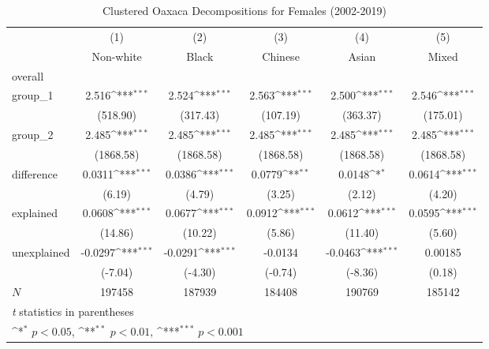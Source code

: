 \begin{table}[htbp]\centering
\def\sym#1{\ifmmode^{#1}\else\(^{#1}\)\fi}
\caption{Clustered Oaxaca Decompositions for Females (2002-2019)\label{tab1}}
\begin{tabular}{l*{5}{c}}
\hline\hline
            &\multicolumn{1}{c}{(1)}&\multicolumn{1}{c}{(2)}&\multicolumn{1}{c}{(3)}&\multicolumn{1}{c}{(4)}&\multicolumn{1}{c}{(5)}\\
            &\multicolumn{1}{c}{Non-white}&\multicolumn{1}{c}{Black}&\multicolumn{1}{c}{Chinese}&\multicolumn{1}{c}{Asian}&\multicolumn{1}{c}{Mixed}\\
\hline
overall     &                     &                     &                     &                     &                     \\
group\_1     &       2.516\sym{***}&       2.524\sym{***}&       2.563\sym{***}&       2.500\sym{***}&       2.546\sym{***}\\
            &    (518.90)         &    (317.43)         &    (107.19)         &    (363.37)         &    (175.01)         \\
group\_2     &       2.485\sym{***}&       2.485\sym{***}&       2.485\sym{***}&       2.485\sym{***}&       2.485\sym{***}\\
            &   (1868.58)         &   (1868.58)         &   (1868.58)         &   (1868.58)         &   (1868.58)         \\
difference  &      0.0311\sym{***}&      0.0386\sym{***}&      0.0779\sym{**} &      0.0148\sym{*}  &      0.0614\sym{***}\\
            &      (6.19)         &      (4.79)         &      (3.25)         &      (2.12)         &      (4.20)         \\
explained   &      0.0608\sym{***}&      0.0677\sym{***}&      0.0912\sym{***}&      0.0612\sym{***}&      0.0595\sym{***}\\
            &     (14.86)         &     (10.22)         &      (5.86)         &     (11.40)         &      (5.60)         \\
unexplained &     -0.0297\sym{***}&     -0.0291\sym{***}&     -0.0134         &     -0.0463\sym{***}&     0.00185         \\
            &     (-7.04)         &     (-4.30)         &     (-0.74)         &     (-8.36)         &      (0.18)         \\
\hline
\(N\)       &      197458         &      187939         &      184408         &      190769         &      185142         \\
\hline\hline
\multicolumn{6}{l}{\footnotesize \textit{t} statistics in parentheses}\\
\multicolumn{6}{l}{\footnotesize \sym{*} \(p<0.05\), \sym{**} \(p<0.01\), \sym{***} \(p<0.001\)}\\
\end{tabular}
\label{tab:oaxaca_female_clustered}
\end{table}
